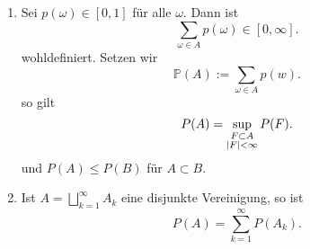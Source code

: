 \begin{lemma}
    \begin{enumerate}[label=\protect\circled{\alph*}]
        \item Sei $p(\omega) \in [0,1]$ für alle $\omega$. Dann ist
            \[
                \sum_{\omega\in A} p(\omega) \in [0,\infty]
            .\] 
            wohldefiniert. Setzen wir
            \[
                \mathbb{P}(A) := \sum_{\omega\in A} p(w)
            .\] 
            so gilt
            \[
                P(A) = \sup_{\substack{F\subset A \\ \lvert F\rvert <\infty}} P(F)
            .\] 
            und $P(A) \leq  P(B)$ für $A\subset B$.
        \item Ist $A = \bigsqcup_{k=1}^{\infty} A_k$ eine disjunkte Vereinigung, so ist
            \[
                P(A) = \sum_{k=1}^{\infty}P(A_k)
            .\] 
    \end{enumerate}
\end{lemma}
